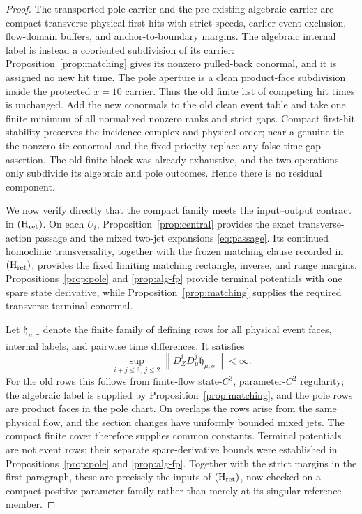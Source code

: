 \documentclass[11pt,reqno]{amsart}
\numberwithin{equation}{section}
\theoremstyle{definition}
\theoremstyle{remark}
\newcommand{\norm}[1]{\left\lVert #1\right\rVert}
\begin{document}
\begin{proof}
The transported pole carrier and the pre-existing algebraic carrier are
compact transverse physical first hits with strict speeds, earlier-event
exclusion, flow-domain buffers, and anchor-to-boundary margins.  The
algebraic internal label is instead a cooriented subdivision of its carrier:
Proposition~\ref{prop:matching} gives its nonzero pulled-back conormal, and it
is assigned no new hit time.  The pole aperture is a clean product-face
subdivision inside the protected $x=10$ carrier.  Thus the old finite list of
competing hit times is unchanged.  Add the new conormals to the old clean
event table and take one finite minimum of all normalized nonzero ranks and
strict gaps.  Compact first-hit stability preserves the incidence complex and
physical order; near a genuine tie the nonzero tie conormal and the fixed
priority replace any false time-gap assertion.  The old finite block was
already exhaustive, and the two operations only subdivide its algebraic and
pole outcomes.  Hence there is no residual component.

We now verify directly that the compact family meets the input--output
contract in \({\rm(H_{ret})}\).  On each $U_i$,
Proposition~\ref{prop:central} provides the exact transverse-action passage
and the mixed two-jet expansions \eqref{eq:passage}.  Its continued homoclinic
transversality, together with the frozen matching clause recorded in
\({\rm(H_{ret})}\), provides the fixed limiting matching rectangle, inverse,
and range margins.  Propositions~\ref{prop:pole} and \ref{prop:alg-fp}
provide terminal potentials with one spare state derivative, while
Proposition~\ref{prop:matching} supplies the required transverse terminal
conormal.

Let $\mathfrak h_{\mu,\sigma}$ denote the finite family of defining rows for
all physical event faces, internal labels, and pairwise time differences.
It satisfies
\begin{equation}\label{eq:event-row-bound}
 \sup_{i+j\le3,\ j\le2}
 \norm{D_Z^iD_\mu^j\mathfrak h_{\mu,\sigma}}<\infty.
\end{equation}
For the old rows this follows from finite-flow state-$C^3$, parameter-$C^2$
regularity; the algebraic label is supplied by
Proposition~\ref{prop:matching}, and the pole rows are product faces in the
pole chart.  On overlaps the rows arise from the same physical flow, and the
section changes have uniformly bounded mixed jets.  The compact finite cover
therefore supplies common constants.  Terminal potentials are not event
rows; their separate spare-derivative bounds were established in
Propositions~\ref{prop:pole} and \ref{prop:alg-fp}.  Together with the strict
margins in the first paragraph, these are precisely the inputs of
\({\rm(H_{ret})}\), now checked on a compact positive-parameter family rather
than merely at its singular reference member.


\end{proof}
\end{document}
